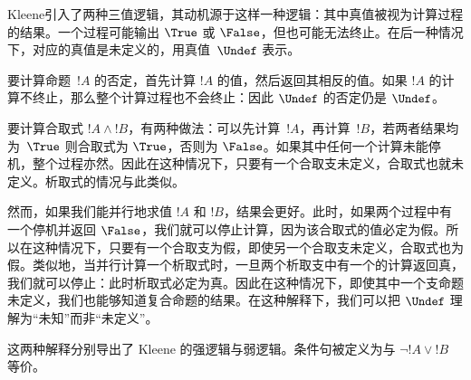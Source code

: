 \documentclass[../../../include/open-logic-section]{subfiles}
\begin{document}


Kleene引入了两种三值逻辑，其动机源于这样一种逻辑：其中真值被视为计算过程的结果。一个过程可能输出 $\True$ 或 $\False$，但也可能无法终止。在后一种情况下，对应的真值是未定义的，用真值~$\Undef$ 表示。

要计算命题~$!A$ 的否定，首先计算 $!A$ 的值，然后返回其相反的值。如果 $!A$ 的计算不终止，那么整个计算过程也不会终止：因此 $\Undef$ 的否定仍是 $\Undef$。

要计算合取式 $!A \land !B$，有两种做法：可以先计算~$!A$，再计算~$!B$，若两者结果均为~$\True$ 则合取式为 $\True$，否则为 $\False$。如果其中任何一个计算未能停机，整个过程亦然。因此在这种情况下，只要有一个合取支未定义，合取式也就未定义。析取式的情况与此类似。

然而，如果我们能并行地求值 $!A$ 和 $!B$，结果会更好。此时，如果两个过程中有一个停机并返回 $\False$，我们就可以停止计算，因为该合取式的值必定为假。所以在这种情况下，只要有一个合取支为假，即使另一个合取支未定义，合取式也为假。类似地，当并行计算一个析取式时，一旦两个析取支中有一个的计算返回真，我们就可以停止：此时析取式必定为真。因此在这种情况下，即使其中一个支命题未定义，我们也能够知道复合命题的结果。在这种解释下，我们可以把 $\Undef$ 理解为“未知”而非“未定义”。

这两种解释分别导出了 Kleene 的强逻辑与弱逻辑。条件句被定义为与 $\lnot !A \lor !B$ 等价。
\end{document}

